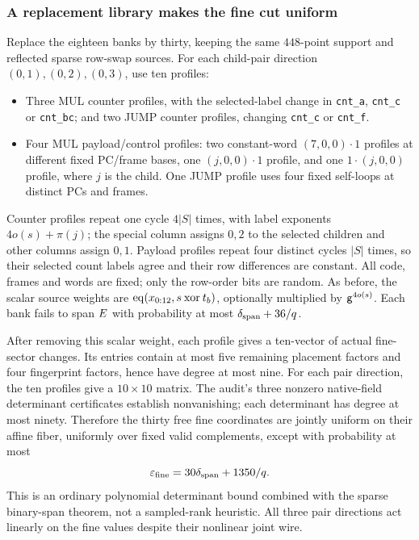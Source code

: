 \subsubsection{A replacement library makes the fine cut uniform}

Replace the eighteen banks by thirty, keeping the same $448$-point support and reflected sparse row-swap sources. For each child-pair direction $(0,1),(0,2),(0,3)$, use ten profiles:
\begin{itemize}
\item Three MUL counter profiles, with the selected-label change in \texttt{cnt\_a}, \texttt{cnt\_c} or \texttt{cnt\_bc}; and two JUMP counter profiles, changing \texttt{cnt\_c} or \texttt{cnt\_f}.
\item Four MUL payload/control profiles: two constant-word $(7,0,0)\cdot1$ profiles at different fixed PC/frame bases, one $(j,0,0)\cdot1$ profile, and one $1\cdot(j,0,0)$ profile, where $j$ is the child. One JUMP profile uses four fixed self-loops at distinct PCs and frames.
\end{itemize}
Counter profiles repeat one cycle $4|S|$ times, with label exponents $4o(s)+\pi(j)$; the special column assigns $0,2$ to the selected children and other columns assign $0,1$. Payload profiles repeat four distinct cycles $|S|$ times, so their selected count labels agree and their row differences are constant. All code, frames and words are fixed; only the row-order bits are random. As before, the scalar source weights are $\operatorname{eq}(x_{0:12},s\mathbin{\mathrm{xor}}t_b)$, optionally multiplied by $\mathsf{g}^{4o(s)}$. Each bank fails to span $E$ with probability at most $\delta_{\rm span}+36/q$.

After removing this scalar weight, each profile gives a ten-vector of actual fine-sector changes. Its entries contain at most five remaining placement factors and four fingerprint factors, hence have degree at most nine. For each pair direction, the ten profiles give a $10\times10$ matrix. The audit's three nonzero native-field determinant certificates establish nonvanishing; each determinant has degree at most ninety. Therefore the thirty free fine coordinates are jointly uniform on their affine fiber, uniformly over fixed valid complements, except with probability at most
\[
 \varepsilon_{\rm fine}=30\delta_{\rm span}+1350/q.
\]
This is an ordinary polynomial determinant bound combined with the sparse binary-span theorem, not a sampled-rank heuristic. All three pair directions act linearly on the fine values despite their nonlinear joint wire.

